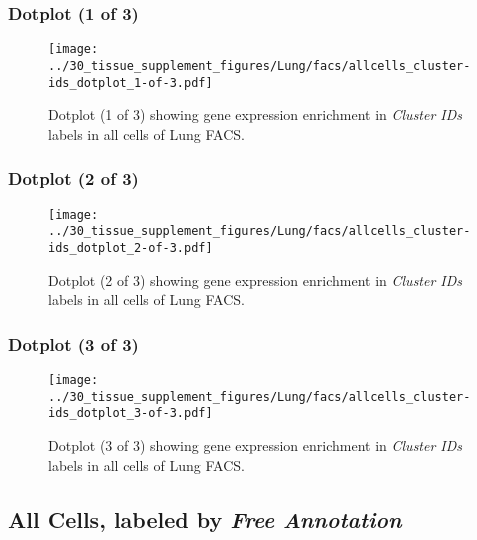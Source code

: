 \clearpage

\subsubsection{Dotplot (1 of 3)}
\begin{figure}[h]
\centering
\texttt{[image: ../30\_tissue\_supplement\_figures/Lung/facs/allcells\_cluster-ids\_dotplot\_1-of-3.pdf]}

\caption{ Dotplot (1 of 3)  showing gene expression enrichment in \emph{Cluster IDs} labels in all cells of Lung FACS. }
\end{figure}


\clearpage

\subsubsection{Dotplot (2 of 3)}
\begin{figure}[h]
\centering
\texttt{[image: ../30\_tissue\_supplement\_figures/Lung/facs/allcells\_cluster-ids\_dotplot\_2-of-3.pdf]}

\caption{ Dotplot (2 of 3)  showing gene expression enrichment in \emph{Cluster IDs} labels in all cells of Lung FACS. }
\end{figure}


\clearpage

\subsubsection{Dotplot (3 of 3)}
\begin{figure}[h]
\centering
\texttt{[image: ../30\_tissue\_supplement\_figures/Lung/facs/allcells\_cluster-ids\_dotplot\_3-of-3.pdf]}

\caption{ Dotplot (3 of 3)  showing gene expression enrichment in \emph{Cluster IDs} labels in all cells of Lung FACS. }
\end{figure}


\clearpage

\subsection{All Cells, labeled by \emph{Free Annotation}}

